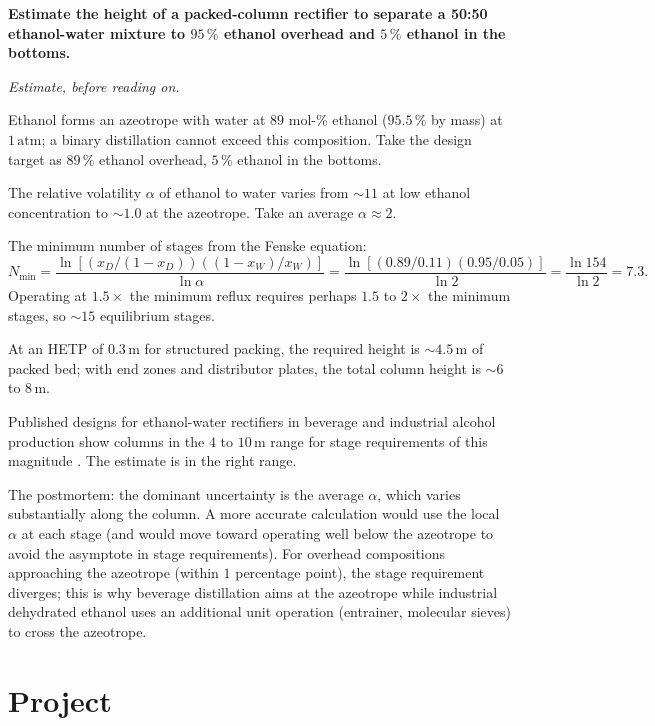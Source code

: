 \begin{estimation}
\textbf{Estimate the height of a packed-column rectifier to separate
a 50:50 ethanol-water mixture to $95\,\%$ ethanol overhead and $5\,\%$
ethanol in the bottoms.}

\smallskip
\textit{Estimate, before reading on.}

\smallskip
Ethanol forms an azeotrope with water at $89$ mol-\% ethanol
($95.5\,\%$ by mass) at $1\,\text{atm}$; a binary distillation cannot
exceed this composition. Take the design target as $89\,\%$ ethanol
overhead, $5\,\%$ ethanol in the bottoms.

The relative volatility $\alpha$ of ethanol to water varies from
$\sim 11$ at low ethanol concentration to $\sim 1.0$ at the
azeotrope. Take an average $\alpha \approx 2$.

The minimum number of stages from the Fenske equation:
\[
N_{\min} = \frac{\ln[(x_D/(1-x_D))((1-x_W)/x_W)]}{\ln \alpha} = \frac{
\ln[(0.89/0.11)(0.95/0.05)]}{\ln 2} = \frac{\ln 154}{\ln 2} = 7.3.
\]
Operating at $1.5 \times$ the minimum reflux requires perhaps $1.5$
to $2 \times$ the minimum stages, so $\sim 15$ equilibrium stages.

At an HETP of $0.3\,\text{m}$ for structured packing, the required
height is $\sim 4.5\,\text{m}$ of packed bed; with end zones and
distributor plates, the total column height is $\sim 6$ to
$8\,\text{m}$.

Published designs for ethanol-water rectifiers in beverage and
industrial alcohol production show columns in the $4$ to $10\,
\text{m}$ range for stage requirements of this magnitude
\cite{text:treybal-mass-transfer}. The estimate is in the
right range.

The postmortem: the dominant uncertainty is the average $\alpha$,
which varies substantially along the column. A more accurate
calculation would use the local $\alpha$ at each stage (and would
move toward operating well below the azeotrope to avoid the
asymptote in stage requirements). For overhead compositions
approaching the azeotrope (within $1$ percentage point), the stage
requirement diverges; this is why beverage distillation aims at the
azeotrope while industrial dehydrated ethanol uses an additional
unit operation (entrainer, molecular sieves) to cross the azeotrope.
\end{estimation}

\section{Project}

